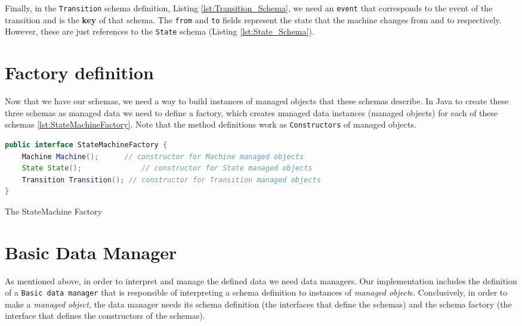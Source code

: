 Finally, in the \texttt{Transition} schema definition, Listing \ref{lst:Transition_Schema}, we need an \texttt{event} that corresponds to the event of the transition and is the \textbf{key} of that schema.
The \texttt{from} and \texttt{to} fields represent the state that the machine changes from and to respectively.
However, these are just references to the \texttt{State} schema (Listing \ref{lst:State_Schema}).

\section{Factory definition}
Now that we have our schemas, we need a way to build instances of managed objects that these schemas describe. 
In Java to create these three schemas as managed data we need to define a factory, which creates managed data instances (managed objects) for each of these schemas \ref{lst:StateMachineFactory}.
Note that the method definitions work as \texttt{Constructors} of managed objects.

\begin{sourcecode}[H]
	\begin{lstlisting}[language=Java,escapechar=|]
public interface StateMachineFactory {
	Machine Machine();  	// constructor for Machine managed objects
	State State(); 				// constructor for State managed objects
	Transition Transition(); // constructor for Transition managed objects
}
	\end{lstlisting}
	\caption{The StateMachine Factory}
	\label{lst:StateMachineFactory}
\end{sourcecode}

\section{Basic Data Manager}
As mentioned above, in order to interpret and manage the defined data we need data managers. 
Our implementation includes the definition of a \texttt{Basic data manager} that is responsible of interpreting a schema definition to instances of \textit{managed object}s.
Conclusively, in order to make a \textit{managed object}, the data manager needs its schema definition (the interfaces that define the schemas) and the schema factory (the interface that defines the constructors of the schemas).


